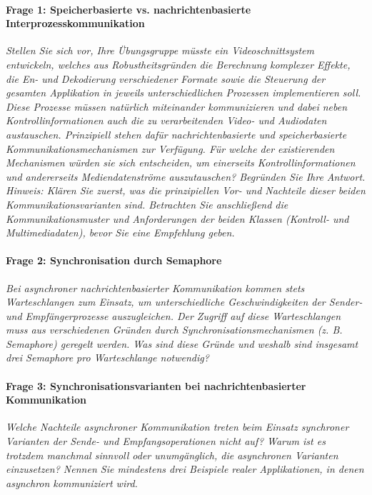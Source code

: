 \documentclass[a4paper]{article}
\begin{document}
\paragraph{Frage 1: Speicherbasierte vs. nachrichtenbasierte Interprozesskommunikation}
\textit{Stellen Sie sich vor, Ihre Übungsgruppe müsste ein Videoschnittsystem entwickeln, welches aus Robustheitsgründen die Berechnung komplexer Effekte, die En- und Dekodierung verschiedener Formate sowie die Steuerung der gesamten Applikation in jeweils unterschiedlichen Prozessen implementieren soll. Diese Prozesse müssen natürlich miteinander kommunizieren und dabei neben Kontrollinformationen auch die zu verarbeitenden Video- und Audiodaten austauschen.
    Prinzipiell stehen dafür nachrichtenbasierte und speicherbasierte Kommunikationsmechanismen zur Verfügung. Für welche der existierenden Mechanismen würden sie sich entscheiden, um einerseits Kontrollinformationen und andererseits Mediendatenströme auszutauschen? Begründen Sie Ihre Antwort.\\
    Hinweis: Klären Sie zuerst, was die prinzipiellen Vor- und Nachteile dieser beiden Kommunikationsvarianten sind. Betrachten Sie anschließend die Kommunikationsmuster und Anforderungen der beiden Klassen (Kontroll- und Multimediadaten), bevor Sie eine Empfehlung geben.
}

\vspace{10mm}
\paragraph{Frage 2: Synchronisation durch Semaphore}
\textit{Bei asynchroner nachrichtenbasierter Kommunikation kommen stets Warteschlangen zum Einsatz, um unterschiedliche Geschwindigkeiten der Sender- und Empfängerprozesse auszugleichen. Der Zugriff auf diese Warteschlangen muss aus verschiedenen Gründen durch Synchronisationsmechanismen (z. B. Semaphore) geregelt werden. Was sind diese Gründe und weshalb sind insgesamt drei Semaphore pro Warteschlange notwendig?}

\vspace{10mm}
\paragraph{Frage 3: Synchronisationsvarianten bei nachrichtenbasierter Kommunikation}
\textit{Welche Nachteile asynchroner Kommunikation treten beim Einsatz synchroner Varianten der Sende- und Empfangsoperationen nicht auf? Warum ist es trotzdem manchmal sinnvoll oder unumgänglich, die asynchronen Varianten einzusetzen? Nennen Sie mindestens drei Beispiele realer Applikationen, in denen asynchron kommuniziert wird.}
\end{document}
